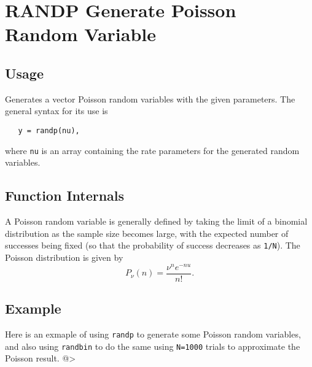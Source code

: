 \section{RANDP Generate Poisson Random Variable}

\subsection{Usage}

Generates a vector Poisson random variables with the given
parameters.  The general syntax for its use is
\begin{verbatim}
   y = randp(nu),
\end{verbatim}
where \verb|nu| is an array containing the rate parameters
for the generated random variables.  
\subsection{Function Internals}

A Poisson random variable is generally defined by taking the
limit of a binomial distribution as the sample size becomes
large, with the expected number of successes being fixed (so
that the probability of success decreases as \verb|1/N|).  
The Poisson distribution is given by
\[
  P_{\nu}(n) = \frac{\nu^n e^{-nu}}{n!}.
\]
\subsection{Example}

Here is an exmaple of using \verb|randp| to generate some Poisson
random variables, and also using \verb|randbin| to do the same
using \verb|N=1000| trials to approximate the Poisson result.
@>
